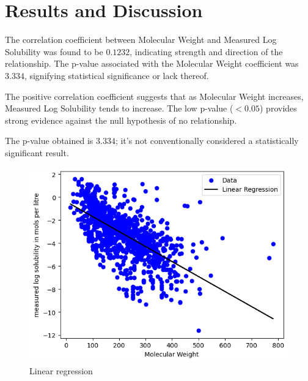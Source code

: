 \documentclass{article}
\begin{document}
\section*{Results and Discussion}

The correlation coefficient between Molecular Weight and Measured Log Solubility was found to be $0.1232$, indicating strength and direction of the relationship. The p-value associated with the Molecular Weight coefficient was $3.334$, signifying statistical significance or lack thereof.

The positive correlation coefficient suggests that as Molecular Weight increases, Measured Log Solubility tends to increase. The low p-value ($< 0.05$) provides strong evidence against the null hypothesis of no relationship.

The p-value obtained is $3.334$; it's not conventionally considered a statistically significant result.

\begin{figure}[h]
    \centering
    \includegraphics[width=0.6\linewidth]{download.png}
    \caption{Linear regression}
    \label{fig:Linear regression}
\end{figure}
\end{document}
